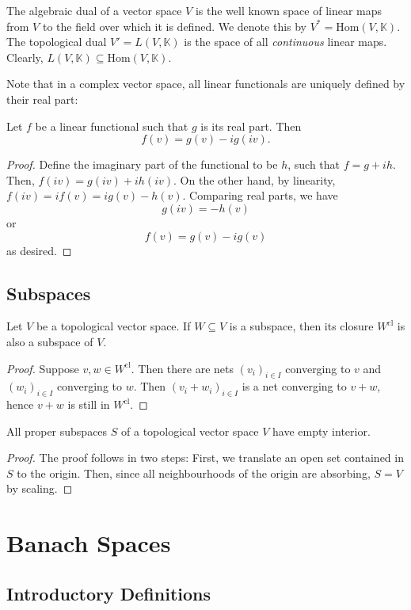 \documentclass[twoside,symmetric, openany, 12pt]{./tuftebook}
\theoremstyle{definition}
\theoremstyle{definition}
\theoremstyle{definition}
\begin{document}
	\begin{Definition}
		The algebraic dual of a vector space $V$ is the well known space of linear maps from $V$ to the field over which it is defined. We denote this by $V^*=\text{Hom}(V,\mathbb{K})$. The topological dual $V'=L(V, \mathbb{K})$ is the space of all \emph{continuous} linear maps. Clearly, $L(V, \mathbb{K})\subseteq \text{Hom}(V,\mathbb{K})$.
	\end{Definition}
Note that in a complex vector space, all linear functionals are uniquely defined by their real part:
\begin{Theorem}
	Let $f$ be a linear functional such that $g$ is its real part. Then
	\[f(v) = g(v) - ig(iv).\]
\end{Theorem}
\begin{proof}
	Define the imaginary part of the functional to be $h$, such that $f=g+ih$. Then, $f(iv) = g(iv) + ih(iv)$. On the other hand, by linearity, $f(iv) = if(v) = ig(v) - h(v)$. Comparing real parts, we have
	\[g(iv) = -h(v)\]
	or
	\[f(v) = g(v) - ig(v)\]
	as desired.
\end{proof}
	\section{Subspaces}
	\begin{Theorem}
		Let $V$ be a topological vector space. If $W\subseteq V$ is a subspace, then its closure $W^\text{cl}$ is also a subspace of $V$.
	\end{Theorem}
	\begin{proof}
Suppose $v,w\in W^\text{cl}$. Then there are nets $(v_i)_{i\in I}$ converging to $v$ and $(w_i)_{i\in I}$ converging to $w$. Then $(v_i+w_i)_{i\in I}$ is a net converging to $v+w$, hence $v+w$ is still in $W^\text{cl}$. 
	\end{proof}
\begin{Theorem}
	All proper subspaces $S$ of a topological vector space $V$ have empty interior.
\end{Theorem}
\begin{proof}
The proof follows in two steps: First, we translate an open set contained in $S$ to the origin. Then, since all neighbourhoods of the origin are absorbing, $S=V$ by scaling.
\end{proof}
	\chapter{Banach Spaces}
	\section{Introductory Definitions}
\end{document}
